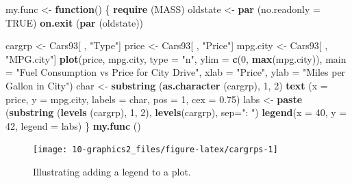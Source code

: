 \documentclass[
]{book}
\newenvironment{Shaded}{\begin{snugshade}}{\end{snugshade}}
\newcommand{\AttributeTok}[1]{\textcolor[rgb]{0.13,0.29,0.53}{#1}}
\newcommand{\ConstantTok}[1]{\textcolor[rgb]{0.56,0.35,0.01}{#1}}
\newcommand{\ControlFlowTok}[1]{\textcolor[rgb]{0.13,0.29,0.53}{\textbf{#1}}}
\newcommand{\DecValTok}[1]{\textcolor[rgb]{0.00,0.00,0.81}{#1}}
\newcommand{\FloatTok}[1]{\textcolor[rgb]{0.00,0.00,0.81}{#1}}
\newcommand{\FunctionTok}[1]{\textcolor[rgb]{0.13,0.29,0.53}{\textbf{#1}}}
\newcommand{\NormalTok}[1]{#1}
\newcommand{\OtherTok}[1]{\textcolor[rgb]{0.56,0.35,0.01}{#1}}
\newcommand{\StringTok}[1]{\textcolor[rgb]{0.31,0.60,0.02}{#1}}
\begin{document}
\begin{Shaded}
\begin{Highlighting}[]
\NormalTok{my.func }\OtherTok{\textless{}{-}} \ControlFlowTok{function}\NormalTok{()}
\NormalTok{\{ }\FunctionTok{require}\NormalTok{ (MASS)  }
\NormalTok{  oldstate }\OtherTok{\textless{}{-}} \FunctionTok{par}\NormalTok{ (}\AttributeTok{no.readonly =} \ConstantTok{TRUE}\NormalTok{) }
  \FunctionTok{on.exit}\NormalTok{ (}\FunctionTok{par}\NormalTok{ (oldstate)) }

\NormalTok{  cargrp }\OtherTok{\textless{}{-}}\NormalTok{ Cars93[ , }\StringTok{"Type"}\NormalTok{]}
\NormalTok{  price }\OtherTok{\textless{}{-}}\NormalTok{ Cars93[ , }\StringTok{"Price"}\NormalTok{]}
\NormalTok{  mpg.city }\OtherTok{\textless{}{-}}\NormalTok{ Cars93[ , }\StringTok{"MPG.city"}\NormalTok{]}
  \FunctionTok{plot}\NormalTok{(price, mpg.city, }\AttributeTok{type =} \StringTok{"n"}\NormalTok{, }\AttributeTok{ylim =} \FunctionTok{c}\NormalTok{(}\DecValTok{0}\NormalTok{, }\FunctionTok{max}\NormalTok{(mpg.city)), }
       \AttributeTok{main =} \StringTok{"Fuel Consumption vs Price for City Drive"}\NormalTok{, }\AttributeTok{xlab =} \StringTok{"Price"}\NormalTok{, }
       \AttributeTok{ylab =} \StringTok{"Miles per Gallon in City"}\NormalTok{)}
\NormalTok{  char }\OtherTok{\textless{}{-}} \FunctionTok{substring}\NormalTok{ (}\FunctionTok{as.character}\NormalTok{ (cargrp), }\DecValTok{1}\NormalTok{, }\DecValTok{2}\NormalTok{)}
  \FunctionTok{text}\NormalTok{ (}\AttributeTok{x =}\NormalTok{ price, }\AttributeTok{y =}\NormalTok{ mpg.city, }\AttributeTok{labels =}\NormalTok{ char, }\AttributeTok{pos =} \DecValTok{1}\NormalTok{, }\AttributeTok{cex =} \FloatTok{0.75}\NormalTok{)}
\NormalTok{  labs }\OtherTok{\textless{}{-}} \FunctionTok{paste}\NormalTok{ (}\FunctionTok{substring}\NormalTok{ (}\FunctionTok{levels}\NormalTok{ (cargrp), }\DecValTok{1}\NormalTok{, }\DecValTok{2}\NormalTok{), }\FunctionTok{levels}\NormalTok{(cargrp), }\AttributeTok{sep=}\StringTok{":  "}\NormalTok{)}
  \FunctionTok{legend}\NormalTok{(}\AttributeTok{x =} \DecValTok{40}\NormalTok{, }\AttributeTok{y =} \DecValTok{42}\NormalTok{, }\AttributeTok{legend =}\NormalTok{ labs)}
\NormalTok{\}}
\FunctionTok{my.func}\NormalTok{ ()}
\end{Highlighting}
\end{Shaded}

\begin{figure}
\texttt{[image: 10-graphics2\_files/figure-latex/cargrps-1]} \caption{Illustrating adding a legend to a plot.}\label{fig:cargrps}
\end{figure}
\end{document}
